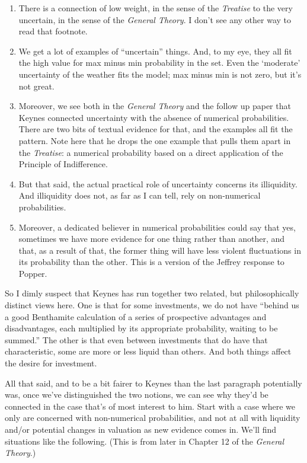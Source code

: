 \documentclass[
  11pt,
  letterpaper,
  DIV=11,
  numbers=noendperiod,
  oneside]{scrartcl}
\providecommand{\tightlist}{%
  \setlength{\itemsep}{0pt}\setlength{\parskip}{0pt}}\usepackage{longtable,booktabs,array}
\begin{document}
\begin{enumerate}
\def\labelenumi{\arabic{enumi}.}
\tightlist
\item
  There is a connection of low weight, in the sense of the
  \emph{Treatise} to the very uncertain, in the sense of the
  \emph{General Theory}. I don't see any other way to read that
  footnote.
\item
  We get a lot of examples of ``uncertain'' things. And, to my eye, they
  all fit the high value for max minus min probability in the set. Even
  the `moderate' uncertainty of the weather fits the model; max minus
  min is not zero, but it's not great.
\item
  Moreover, we see both in the \emph{General Theory} and the follow up
  paper that Keynes connected uncertainty with the absence of numerical
  probabilities. There are two bits of textual evidence for that, and
  the examples all fit the pattern. Note here that he drops the one
  example that pulls them apart in the \emph{Treatise}: a numerical
  probability based on a direct application of the Principle of
  Indifference.
\item
  But that said, the actual practical role of uncertainty concerns its
  illiquidity. And illiquidity does not, as far as I can tell, rely on
  non-numerical probabilities.
\item
  Moreover, a dedicated believer in numerical probabilities could say
  that yes, sometimes we have more evidence for one thing rather than
  another, and that, as a result of that, the former thing will have
  less violent fluctuations in its probability than the other. This is a
  version of the Jeffrey response to Popper.
\end{enumerate}

So I dimly suspect that Keynes has run together two related, but
philosophically distinct views here. One is that for some investments,
we do not have ``behind us a good Benthamite calculation of a series of
prospective advantages and disadvantages, each multiplied by its
appropriate probability, waiting to be summed.'' The other is that even
between investments that do have that characteristic, some are more or
less liquid than others. And both things affect the desire for
investment.

All that said, and to be a bit fairer to Keynes than the last paragraph
potentially was, once we've distinguished the two notions, we can see
why they'd be connected in the case that's of most interest to him.
Start with a case where we only are concerned with non-numerical
probabilities, and not at all with liquidity and/or potential changes in
valuation as new evidence comes in. We'll find situations like the
following. (This is from later in Chapter 12 of the \emph{General
Theory}.)
\end{document}
